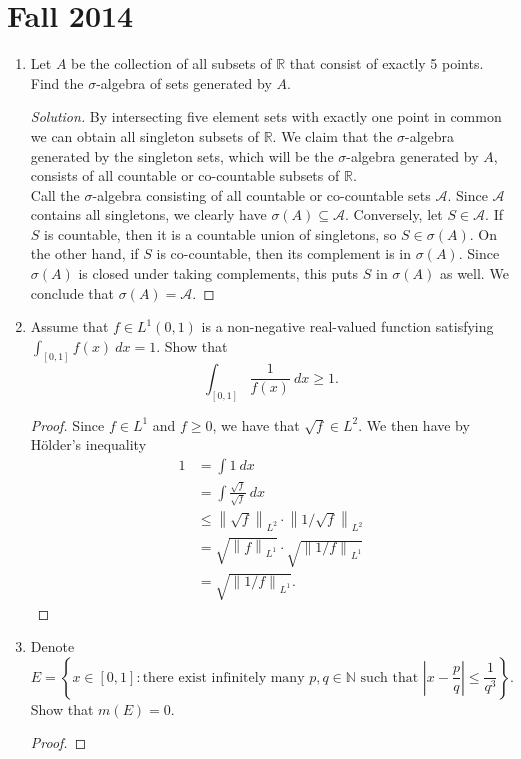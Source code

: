 \documentclass[11pt,letterpaper]{report}
\newcommand{\naturals}{\mathbb{N}}
\newcommand{\reals}{\mathbb{R}}
\newcommand{\mcal}[1]{\mathcal{#1}}
\newcommand{\Lp}[2]{\left\|{#1}\right\|_{L^{#2}}}
\newenvironment{solution}
{\begin{proof}[Solution]}
{\end{proof}}
\begin{document}
\section{Fall 2014}
\begin{enumerate}
	\item Let $A$ be the collection of all subsets of $\reals$ that consist of exactly 5 points. Find the $\sigma$-algebra of sets generated by $A$.
	\begin{solution}
		By intersecting five element sets with exactly one point in common we can obtain all singleton subsets of $\mathbb{R}$. We claim that the $\sigma$-algebra generated by the singleton sets, which will be the $\sigma$-algebra generated by $A$, consists of all countable or co-countable subsets of $\mathbb{R}$.\\

		\noindent Call the $\sigma$-algebra consisting of all countable or co-countable sets $\mcal{A}$. Since $\mcal{A}$ contains all singletons, we clearly have $\sigma(A)\subseteq \mcal{A}$. Conversely, let $S\in \mcal{A}$. If $S$ is countable, then it is a countable union of singletons, so $S\in \sigma(A)$. On the other hand, if $S$ is co-countable, then its complement is in $\sigma(A)$. Since $\sigma(A)$ is closed under taking complements, this puts $S$ in $\sigma(A)$ as well. We conclude that $\sigma(A) = \mcal{A}$.
	\end{solution}

	\item Assume that $f\in L^1(0, 1)$ is a non-negative real-valued function satisfying $\int_{[0,1]}f(x)\ dx = 1$. Show that
	\[
	\int_{[0,1]}\frac{1}{f(x)}\ dx \geq 1.
	\]
	\begin{proof}
		Since $f\in L^1$ and $f\geq 0$, we have that $\sqrt{f}\in L^2$. We then have by H\"older's inequality
		\begin{align*}
			1 &= \int 1\ dx\\
			&= \int \frac{\sqrt{f}}{\sqrt{f}}\ dx\\
			&\leq \Lp{\sqrt{f}}{2} \cdot \Lp{1/\sqrt{f}}{2}\\
			&= \sqrt{\Lp{f}{1}}\cdot \sqrt{\Lp{1/f}{1}}\\
			&= \sqrt{\Lp{1/f}{1}}.
		\end{align*}
	\end{proof}

	\item Denote
	\[
	E = \left\{x\in [0,1]: \text{there exist infinitely many $p, q\in \naturals$ such that }|x-\frac{p}{q}| \leq \frac{1}{q^3}\right\}.
	\]
	Show that $m(E) = 0$.
	\begin{proof}
	\end{proof}
\end{enumerate}
\end{document}
